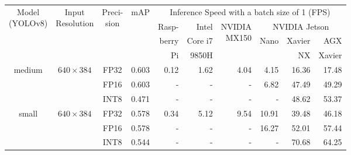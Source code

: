 \begin{appendices}
\begin{table}[h]
    \footnotesize
    \centering
    \begin{tabular}{|c|c|c|c|rrrrrr|}
        \hline
        \multirow{4}{*}{\parbox{1.6cm}{\centering Model\\(YOLOv8)}} &
          \multirow{4}{*}{\parbox{1.5cm}{\centering Input\\Resolution}} &
            \multirow{4}{*}{\parbox{0.9cm}{\centering Preci-\\sion}} &
              \multirow{4}{*}{mAP} &
                \multicolumn{6}{c|}{Inference Speed with a batch size of 1 (FPS)} \\
        \cline{5-10}
        & & & & Rasp- & Intel   &\multirow{3}{*}{\parbox{1.2cm}{\raggedleft NVIDIA\\MX150}} & \multicolumn{3}{|c|}{NVIDIA Jetson} \\
        \cline{8-10}
        & & & & berry & Core i7 &                                                           & \multicolumn{1}{|c}{\multirow{2}{*}{Nano}} & Xavier & AGX \\
        & & & & Pi    & 9850H   &                                                           & \multicolumn{1}{|c}{}                      & NX     & Xavier \\
        \hline
        \hline
        \multirow{3}{*}{medium}                                   & \multirow{3}{*}{$640 \times 384$} & FP32 & 0.603 &  0.12 &   1.62 &  4.04 &  4.15 & 16.36 &  17.48 \\
                                                                  &                                   & FP16 & 0.603 &     - &      - &     - &  6.82 & 47.49 &  49.29 \\
                                                                  &                                   & INT8 & 0.471 &     - &      - &     - &     - & 48.62 &  53.37 \\
        \hline
        \multirow{3}{*}{small}                                    & \multirow{3}{*}{$640 \times 384$} & FP32 & 0.578 &  0.34 &   5.12 &  9.54 & 10.91 & 39.48 &  46.18 \\
                                                                  &                                   & FP16 & 0.578 &     - &      - &     - & 16.27 & 52.01 &  57.44 \\
                                                                  &                                   & INT8 & 0.544 &     - &      - &     - &     - & 70.68 &  64.25 \\

\end{tabular}
\end{table}
\end{appendices}
